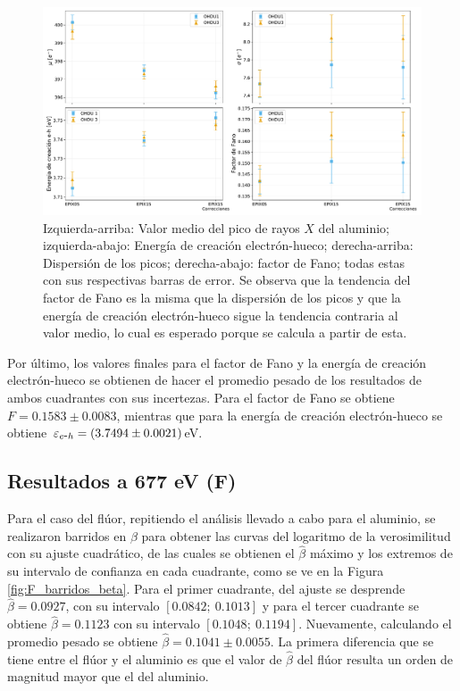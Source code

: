 \begin{figure}[h]
    \centering
        \includegraphics[scale=0.45]{Figs/Al_mu_sigma_fano_Eeh.pdf}
    \caption{Izquierda-arriba: Valor medio del pico de rayos $X$ del aluminio; izquierda-abajo: Energía de creación electrón-hueco; derecha-arriba: Dispersión de los picos; derecha-abajo: factor de Fano; todas estas con sus respectivas barras de error. Se observa que la tendencia del factor de Fano es la misma que la dispersión de los picos y que la energía de creación electrón-hueco sigue la tendencia contraria al valor medio, lo cual es esperado porque se calcula a partir de esta.}
    \label{fig:Al_mu_sigma_fano_eh}
\end{figure}

Por último, los valores finales para el factor de Fano y la energía de creación electrón-hueco se obtienen de hacer el promedio pesado de los resultados de ambos cuadrantes con sus incertezas. Para el factor de Fano se obtiene $ F = 0.1583 \pm 0.0083 $, mientras que para la energía de creación electrón-hueco se obtiene $\varepsilon_{e\mbox{-}h} =(3.7494\pm0.0021)$eV.
\subsection{Resultados a 677 eV (F)}
\noindent Para el caso del flúor, repitiendo el análisis llevado a cabo para el aluminio, se realizaron barridos en $\beta$ para obtener las curvas del logaritmo de la verosimilitud con su ajuste cuadrático, de las cuales se obtienen el $\hat{\beta}$ máximo y los extremos de su intervalo de confianza en cada cuadrante, como se ve en la Figura \ref{fig:F_barridos_beta}. Para el primer cuadrante, del ajuste se desprende $\hat{\beta} = 0.0927 $, con su intervalo $[0.0842;\ 0.1013]$ y para el tercer cuadrante se obtiene $\hat{\beta} = 0.1123 $ con su intervalo $[0.1048;\ 0.1194]$. Nuevamente, calculando el promedio pesado se obtiene $\hat{\beta} = 0.1041 \pm 0.0055 $. La primera diferencia que se tiene entre el flúor y el aluminio es que el valor de $\hat{\beta}$ del flúor resulta un orden de magnitud mayor que el del aluminio.

